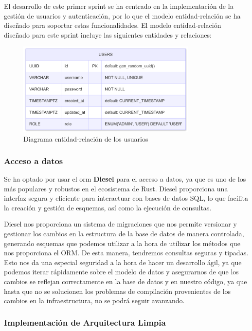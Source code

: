 El desarrollo de este primer sprint se ha centrado en la implementación de la gestión de usuarios y autenticación, por lo que el modelo entidad-relación se ha diseñado para soportar estas funcionalidades.
El modelo entidad-relación diseñado para este sprint incluye las siguientes entidades y relaciones:
\begin{figure}[H]
    \begin{center}
        \includegraphics[width=0.8\textwidth]{assets/sprint1/users-er-diagram.png}
    \end{center}
    \caption{Diagrama entidad-relación de los usuarios}\label{fig:users-er-diagram}
\end{figure}


\subsubsection{Acceso a datos}
Se ha optado por usar el \acrshort{orm} \textbf{Diesel} para el acceso a datos, ya que es uno de los más populares y robustos en el ecosistema de Rust. Diesel proporciona una interfaz segura y eficiente para interactuar con bases de datos SQL, lo que facilita la creación y gestión de esquemas, así como la ejecución de consultas.

Diesel nos proporciona un sistema de migraciones que nos permite versionar y gestionar los cambios en la estructura de la base de datos de manera controlada, generando esquemas que podemos utilizar a la hora de utilizar los métodos que nos proporciona el ORM. De esta manera, tendremos consultas seguras y tipadas.
Esto nos da una especial seguridad a la hora de hacer un desarrollo ágil, ya que podemos iterar rápidamente sobre el modelo de datos y asegurarnos de que los cambios se reflejan correctamente en la base de datos y en nuestro código, ya que hasta que no se solucionen los problemas de compilación provenientes de los cambios en la infraestructura, no se podrá seguir avanzando.

\subsubsection{Implementación de Arquitectura Limpia}

